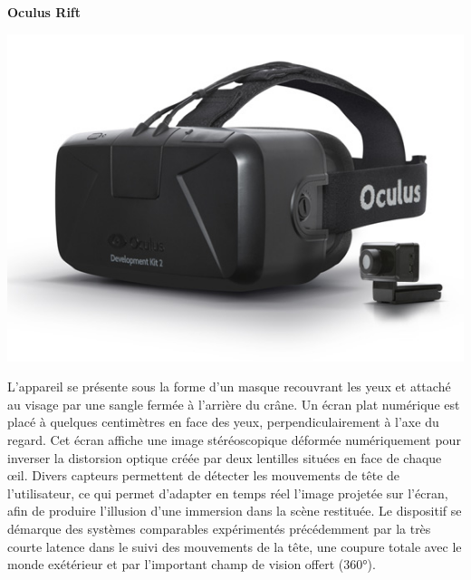 \textbf{Oculus Rift}
\\
	\noindent\begin{minipage}{0.3\textwidth}
		\includegraphics[width=\linewidth]{1-PreEtude/img/occulus rift}
		\end{minipage}
		\hfill
		\begin{minipage}{0.65\textwidth}
			L'appareil se présente sous la forme d'un masque recouvrant les yeux et attaché au visage par une sangle fermée à l'arrière du crâne. Un écran plat numérique est placé à quelques centimètres en face des yeux, perpendiculairement à l'axe du regard. Cet écran affiche une image stéréoscopique déformée numériquement pour inverser la distorsion optique créée par deux lentilles situées en face de chaque œil. Divers capteurs permettent de détecter les mouvements de tête de l'utilisateur, ce qui permet d'adapter en temps réel l'image projetée sur l'écran, afin de produire l'illusion d'une immersion dans la scène restituée.
			Le dispositif se démarque des systèmes comparables expérimentés précédemment par la très courte latence dans le suivi des mouvements de la tête, une coupure totale avec le monde exétérieur et par l'important champ de vision offert (360°).
	\end{minipage}


\\

